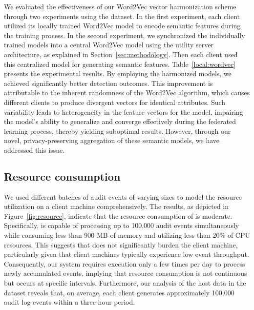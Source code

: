  We evaluated the effectiveness of our Word2Vec vector harmonization scheme through two experiments using the \optc dataset. In the first experiment, each client utilized its locally trained Word2Vec model to encode semantic features during the training process. In the second experiment, we synchronized the individually trained models into a central Word2Vec model using the utility server architecture, as explained in Section~\ref{sec:methodology}. Then each client used this centralized model for generating semantic features. Table~\ref{local:wordvec} presents the experimental results. By employing the harmonized models, we achieved significantly better detection outcomes. This improvement is attributable to the inherent randomness of the Word2Vec algorithm, which causes different clients to produce divergent vectors for identical attributes. Such variability leads to heterogeneity in the feature vectors for the \gnnshort model, impairing the model's ability to generalize and converge effectively during the federated learning process, thereby yielding suboptimal results. However, through our novel, privacy-preserving aggregation of these semantic models, we have addressed this issue.

 \subsection{Resource consumption}

 We used different batches of audit events of varying sizes to model the resource utilization on a client machine comprehensively. The results, as depicted in Figure~\ref{fig:resource}, indicate that the resource consumption of \Sys is moderate. Specifically, \Sys is capable of processing up to 100,000 audit events simultaneously while consuming less than 900 MB of memory and utilizing less than 20\% of CPU resources. This suggests that \Sys does not significantly burden the client machine, particularly given that client machines typically experience low event throughput. Consequently, our system requires execution only a few times per day to process newly accumulated events, implying that resource consumption is not continuous but occurs at specific intervals. Furthermore, our analysis of the host data in the \optc dataset reveals that, on average, each client generates approximately 100,000 audit log events within a three-hour period.

